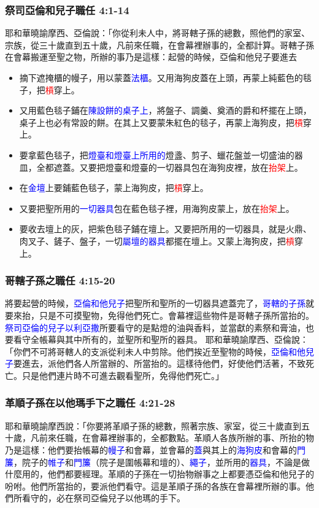 \subsubsection{祭司亞倫和兒子職任 4:1-14}
耶和華曉諭摩西、亞倫說：「你從利未人中，將哥轄子孫的總數，照他們的家室、宗族，從三十歲直到五十歲，凡前來任職，在會幕裡辦事的，全都計算。哥轄子孫在會幕搬運至聖之物，所辦的事乃是這樣：起營的時候，亞倫和他兒子要進去
\begin{itemize} 
\itemsep-.35em
\item 摘下遮掩櫃的幔子，用以蒙蓋\textcolor{blue}{法櫃}。又用海狗皮蓋在上頭，再蒙上純藍色的毯子，把\textcolor{red}{槓}穿上。
\item 又用藍色毯子鋪在\textcolor{blue}{陳設餅的桌子上}，將盤子、調羹、奠酒的爵和杯擺在上頭，桌子上也必有常設的餅。在其上又要蒙朱紅色的毯子，再蒙上海狗皮，把\textcolor{red}{槓}穿上。
\item 要拿藍色毯子，把\textcolor{blue}{燈臺和燈臺上所用的}燈盞、剪子、蠟花盤並一切盛油的器皿，全都遮蓋。又要把燈臺和燈臺的一切器具包在海狗皮裡，放在\textcolor{red}{抬架}上。
\item 在\textcolor{blue}{金壇}上要鋪藍色毯子，蒙上海狗皮，把\textcolor{red}{槓}穿上。
\item 又要把聖所用的\textcolor{blue}{一切器具}包在藍色毯子裡，用海狗皮蒙上，放在\textcolor{red}{抬架}上。
\item 要收去壇上的灰，把紫色毯子鋪在壇上。又要把所用的一切器具，就是火鼎、肉叉子、鏟子、盤子，一切\textcolor{blue}{屬壇的器具}都擺在壇上。又蒙上海狗皮，把\textcolor{red}{槓}穿上。 
\end{itemize}

\subsubsection{哥轄子孫之職任 4:15-20}
將要起營的時候，\textcolor{blue}{亞倫和他兒子}把聖所和聖所的一切器具遮蓋完了，\textcolor{blue}{哥轄的子孫}就要來抬，只是不可摸聖物，免得他們死亡。會幕裡這些物件是哥轄子孫所當抬的。\textcolor{blue}{祭司亞倫的兒子以利亞撒}所要看守的是點燈的油與香料，並當獻的素祭和膏油，也要看守全帳幕與其中所有的，並聖所和聖所的器具。
耶和華曉諭摩西、亞倫說：「你們不可將哥轄人的支派從利未人中剪除。他們挨近至聖物的時候，\textcolor{blue}{亞倫和他兒子}要進去，派他們各人所當辦的、所當抬的。這樣待他們，好使他們活著，不致死亡。只是他們連片時不可進去觀看聖所，免得他們死亡。」

\subsubsection{革順子孫在以他瑪手下之職任 4:21-28}
耶和華曉諭摩西說：「你要將革順子孫的總數，照著宗族、家室，從三十歲直到五十歲，凡前來任職，在會幕裡辦事的，全都數點。革順人各族所辦的事、所抬的物乃是這樣：他們要抬帳幕的\textcolor{blue}{幔子}和會幕，並會幕的\textcolor{blue}{蓋}與其上的\textcolor{blue}{海狗皮}和會幕的\textcolor{blue}{門簾}，院子的\textcolor{blue}{帷子}和\textcolor{blue}{門簾}（院子是圍帳幕和壇的）、\textcolor{blue}{繩子}，並所用的\textcolor{blue}{器具}，不論是做什麼用的，他們都要經理。革順的子孫在一切抬物辦事之上都要憑亞倫和他兒子的吩咐。他們所當抬的，要派他們看守。這是革順子孫的各族在會幕裡所辦的事。他們所看守的，必在祭司亞倫兒子以他瑪的手下。

